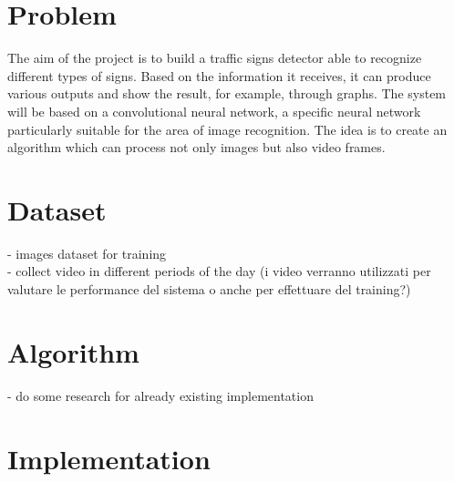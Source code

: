 




\section{Problem}
The aim of the project is to build a traffic signs detector able to recognize different types of signs. Based on the information it receives, it can produce various outputs and show the result, for example, through graphs.
The system will be based on a convolutional neural network, a specific neural network particularly suitable for the area of image recognition.
The idea is to create an algorithm which can process not only images but also video frames.

\section{Dataset}
- images dataset for training \\
- collect video in different periods of the day (i video verranno utilizzati per valutare le performance del sistema o anche per effettuare del training?)

\section{Algorithm}
- do some research for already existing implementation

\section{Implementation}